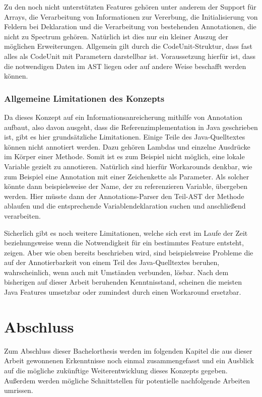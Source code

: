 \documentclass[12pt,oneside,a4paper,parskip]{scrbook}
\begin{document}
Zu den noch nicht unterstützten Features gehören unter anderem der Support für Arrays, die Verarbeitung von Informationen zur Vererbung, die Initialisierung von Feldern bei Deklaration und die Verarbeitung von bestehenden Annotationen, die nicht zu Spectrum gehören. Natürlich ist dies nur ein kleiner Auszug der möglichen Erweiterungen. Allgemein gilt durch die CodeUnit-Struktur, dass fast alles als CodeUnit mit Parametern darstellbar ist. Voraussetzung hierfür ist, dass die notwendigen Daten im AST liegen oder auf andere Weise beschafft werden können.

\subsection{Allgemeine Limitationen des Konzepts}

Da dieses Konzept auf ein Informationsanreicherung mithilfe von Annotation aufbaut, also davon ausgeht, dass die Referenzimplementation in Java geschrieben ist, gibt es hier grundsätzliche Limitationen. Einige Teile des Java-Quelltextes können nicht annotiert werden. Dazu gehören Lambdas und einzelne Ausdrücke im Körper einer Methode. Somit ist es zum Beispiel nicht möglich, eine lokale Variable gezielt zu annotieren. Natürlich sind hierfür Workarounds denkbar, wie zum Beispiel eine Annotation mit einer Zeichenkette als Parameter. Als solcher könnte dann beispielsweise der Name, der zu referenzieren Variable, übergeben werden. Hier müsste dann der Annotations-Parser den Teil-AST der Methode ablaufen und die entsprechende Variablendeklaration suchen und anschließend verarbeiten.

Sicherlich gibt es noch weitere Limitationen, welche sich erst im Laufe der Zeit beziehungsweise wenn die Notwendigkeit für ein bestimmtes Feature entsteht, zeigen. Aber wie oben bereits beschrieben wird, sind beispielsweise Probleme die auf der Annotierbarkeit von einem Teil des Java-Quelltextes beruhen, wahrscheinlich, wenn auch mit Umständen verbunden, lösbar. Nach dem bisherigen auf dieser Arbeit beruhenden Kenntnisstand, scheinen die meisten Java Features umsetzbar oder zumindest durch einen Workaround ersetzbar.

\chapter{Abschluss}

Zum Abschluss dieser Bachelorthesis werden im folgenden Kapitel die aus dieser Arbeit gewonnenen Erkenntnisse noch einmal zusammengefasst und ein Ausblick auf die mögliche zukünftige Weiterentwicklung dieses Konzepts gegeben. Außerdem werden mögliche Schnittstellen für potentielle nachfolgende Arbeiten umrissen.
\end{document}
